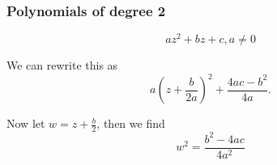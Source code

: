 \documentclass{article}
\begin{document}
		\subsubsection{Polynomials of degree 2}
			\begin{equation*}
				az^2+bz+c, a \neq 0
			\end{equation*}
			
			We can rewrite this as 
			\begin{equation*}
				a(z+\frac{b}{2a})^2 + \frac{4ac-b^2}{4a}.
			\end{equation*}
			
			Now let $w=z+\frac{b}{2}$, then we find
			\begin{equation*}
				w^2 = \frac{b^2-4ac}{4a^2}
			\end{equation*}
\end{document}

